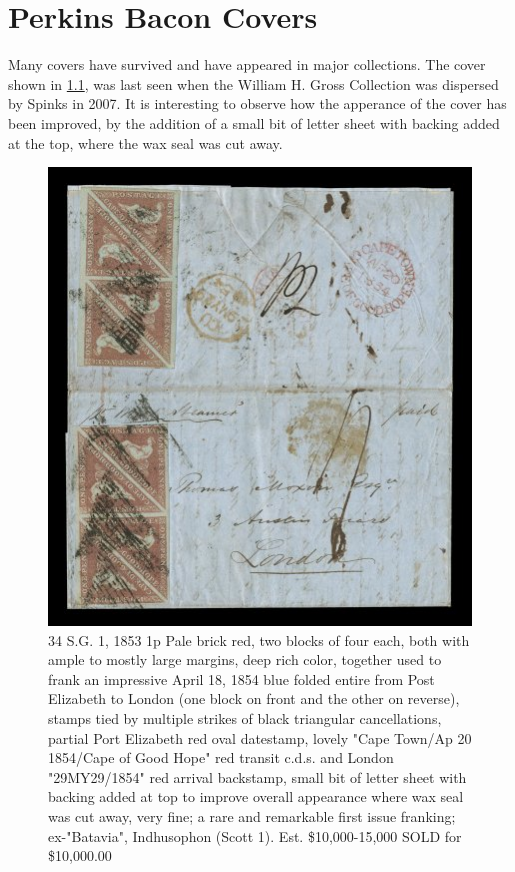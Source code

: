 \chapter{Perkins Bacon Covers}    

Many covers have survived and have appeared in major collections. The cover shown in \ref{brickred}, was last seen when the William H. Gross Collection was dispersed by Spinks in 2007. It is interesting to observe how the apperance of the cover has been improved, by the addition of a small bit of letter sheet with backing added at the top, where the wax seal was cut away. 

\begin{figure}[htbp]
\includegraphics[width=.98\textwidth]{../cape-of-good-hope/perkins-bacon-cover-01.jpg}
\caption{34		S.G. 1, 1853 1p Pale brick red, two blocks of four each, both with ample to mostly large margins, deep rich color, together used to frank an impressive April 18, 1854 blue folded entire from Post Elizabeth to London (one block on front and the other on reverse), stamps tied by multiple strikes of black triangular cancellations, partial Port Elizabeth red oval datestamp, lovely "Cape Town/Ap 20 1854/Cape of Good Hope" red transit c.d.s. and London "29MY29/1854" red arrival backstamp, small bit of letter sheet with backing added at top to improve overall appearance where wax seal was cut away, very fine; a rare and remarkable first issue franking; ex-"Batavia", Indhusophon (Scott 1).  Est. \$10,000-15,000 
SOLD for \$10,000.00} 
\label{brickred}
\end{figure}            